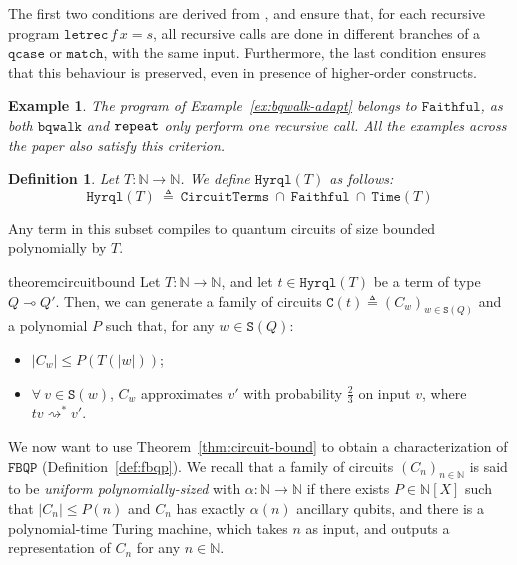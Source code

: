 \documentclass[10pt,a4paper]{article}
\newcommand{\linfunc}{\multimap}
\newcommand{\textqcase}{\ensuremath{\mathtt{qcase}}}
\newcommand{\textmatch}{\ensuremath{\mathtt{match}}}
\newcommand{\textletrec}{\ensuremath{\mathtt{letrec}}}
\newcommand{\letrec}[3]{\textletrec\,#1\,#2=#3}
\newcommand{\reduces}{\rightsquigarrow}
\newcommand{\sreduces}{\reduces^*}
\newcommand{\circuittype}{\ensuremath{\mathtt{CircuitTerms}}}
\newcommand{\hyrqlbound}[1]{\ensuremath{\mathtt{Hyrql}({#1})}}
\newcommand{\boundedrec}{\ensuremath{\mathtt{Faithful}}}
\newcommand{\shapeset}[1]{\mathtt{S}(#1)}
\newcommand{\famcirc}{\mathtt{C}(t)}
\newcommand{\bqwalk}{\mathtt{bqwalk}}
\newcommand{\timeset}[1]{\mathtt{Time}(#1)}
\newcommand{\size}[1]{|#1|}
\newcommand{\fbqp}{\ensuremath{\mathtt{FBQP}}}
\newcommand{\mbN}{\mathbb N}
\newtheorem{definition}[theorem]{Definition}
\newtheorem{example}[theorem]{Example}
\begin{document}
The first two conditions are derived from \cite{HPS25}, and ensure that, for
each recursive program $\letrec f x s$, all recursive calls are done in
different branches of a \textqcase{} or \textmatch{}, with the same input.
Furthermore, the last condition ensures that this behaviour is preserved, even
in presence of higher-order constructs.

\begin{example}
  The program of Example~\ref{ex:bqwalk-adapt} belongs to
  $\boundedrec$, as both $\bqwalk$ and $\tt repeat$ only perform one recursive
  call. All the examples across the paper also satisfy this criterion.
\end{example}

\begin{definition}\label{def:hyrqlbound}
  Let $T : \mbN \to \mbN$. We define $\hyrqlbound T$ as follows:
  \[
    \hyrqlbound T\ \triangleq\ \circuittype\ \cap\ \boundedrec\ \cap\ \timeset T
  \]
\end{definition}

Any term in this subset compiles to quantum circuits of size bounded
polynomially by $T$.

\begin{restatable}{theorem}{circuitbound}
  \label{thm:circuit-bound}
  Let $T : \mbN \to \mbN$, and let $t \in \hyrqlbound T$ be a term of type
  $Q \linfunc Q'$. Then, we can generate a family of circuits
  $\famcirc \triangleq (C_w)_{w \in \shapeset Q}$ and a polynomial $P$ such
  that, for any $w \in \shapeset Q$:
  \begin{itemize}
    \item $\size{C_w} \leq P(T(\size w))$;
    \item $\forall\ v \in \shapeset w$, $C_w$ approximates $v'$ with
      probability $\frac 2 3$ on input $v$, where $tv \sreduces v'$.
  \end{itemize}
\end{restatable}

We now want to use Theorem~\ref{thm:circuit-bound} to obtain a characterization
of \fbqp{} (Definition~\ref{def:fbqp}). We recall that a family of circuits
$(C_n)_{n \in \mbN}$ is said to be \emph{uniform polynomially-sized} with
$\alpha : \mbN \to \mbN$ if there exists $P \in \mbN[X]$ such that $\size{C_n}
\leq P(n)$ and $C_n$ has exactly $\alpha(n)$ ancillary qubits, and there is a
polynomial-time Turing machine, which takes $n$ as input, and outputs a
representation of $C_n$ for any $n \in \mbN$.
\end{document}
